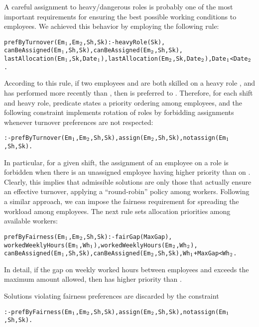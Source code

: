 \documentclass{tlp}
\begin{document}
A careful assignment to heavy/dangerous roles is probably one of the most important
requirements for ensuring the best possible working conditions to employees.
We achieved this behavior by employing the following rule:
\begin{alltt}\small
 prefByTurnover(Em\(\sb{1}\),Em\(\sb{2}\),Sh,Sk) :- heavyRole(Sk),
    canBeAssigned(Em\(\sb{1}\),Sh,Sk), canBeAssigned(Em\(\sb{2}\),Sh,Sk),
    lastAllocation(Em\(\sb{1}\),Sk,Date\(\sb{1}\)), lastAllocation(Em\(\sb{2}\),Sk,Date\(\sb{2}\)), Date\(\sb{1}\) < Date\(\sb{2}\).
\end{alltt}\normalsize
According to this rule, if two employees  and  are both skilled
on a heavy role ,
and  has performed  more recently than ,
then  is preferred to .
Therefore, for each shift and heavy role, predicate  states a priority ordering
among employees, and the following constraint implements rotation of roles
by forbidding assignments whenever turnover preferences are not respected:
\begin{alltt}\small
 :- prefByTurnover(Em\(\sb{1}\),Em\(\sb{2}\),Sh,Sk), assign(Em\(\sb{2}\),Sh,Sk), not assign(Em\(\sb{1}\),Sh,Sk).
\end{alltt}\normalsize
In particular, for a given shift, the assignment of an employee  on a role  is forbidden
when there is an unassigned employee  having higher priority than  on .
Clearly, this implies that admissible solutions are only those that actually ensure an effective turnover,
applying a ``round-robin'' policy among workers.
Following a similar approach, we can impose the fairness requirement for
spreading the workload among employees.
The next rule sets allocation priorities among available workers:
\begin{alltt}\small
 prefByFairness(Em\(\sb{1}\),Em\(\sb{2}\),Sh,Sk) :- fairGap(MaxGap),
    workedWeeklyHours(Em\(\sb{1}\),Wh\(\sb{1}\)), workedWeeklyHours(Em\(\sb{2}\),Wh\(\sb{2}\)),
    canBeAssigned(Em\(\sb{1}\),Sh,Sk), canBeAssigned(Em\(\sb{2}\),Sh,Sk), Wh\(\sb{1}\) + MaxGap < Wh\(\sb{2}\).
\end{alltt}\normalsize
In detail, if the gap on weekly worked hours between employees  and  exceeds
the maximum amount allowed, then  has higher priority than .


Solutions violating fairness preferences
are discarded by the constraint
\begin{alltt}\small
 :- prefByFairness(Em\(\sb{1}\),Em\(\sb{2}\),Sh,Sk), assign(Em\(\sb{2}\),Sh,Sk), not assign(Em\(\sb{1}\),Sh,Sk).
\end{alltt}\normalsize
\end{document}
